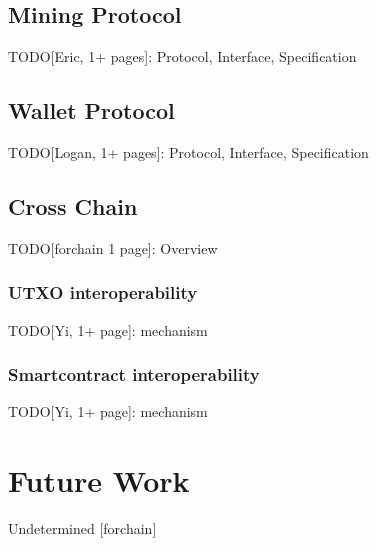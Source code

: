 \documentclass[a4paper,11pt]{article}
\begin{document}
\subsection{Mining Protocol}
TODO[Eric, 1+ pages]: Protocol, Interface, Specification

\subsection{Wallet Protocol}
TODO[Logan, 1+ pages]: Protocol, Interface, Specification

\subsection{Cross Chain}
TODO[forchain 1 page]: Overview

\subsubsection{UTXO interoperability}
TODO[Yi, 1+ page]:  mechanism

\subsubsection{Smartcontract interoperability}
TODO[Yi, 1+ page]: mechanism

\section{Future Work}
Undetermined [forchain] 



\clearpage



%
%


\end{document}
